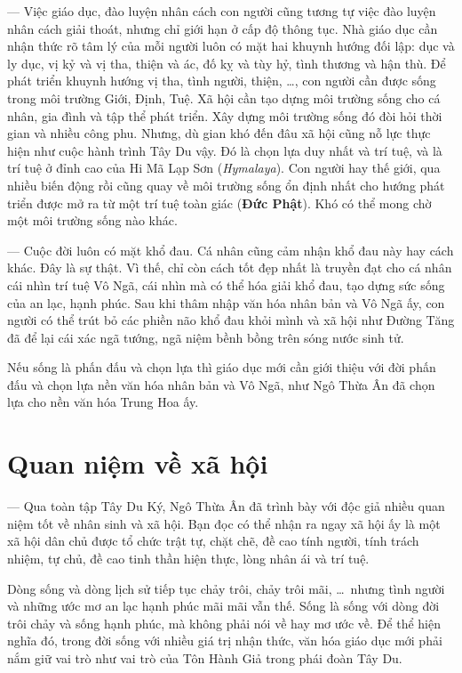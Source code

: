 — Việc giáo dục, đào luyện nhân cách con người cũng tương tự việc đào luyện nhân cách giải thoát, nhưng chỉ giới hạn ở cấp độ thông tục. Nhà giáo dục cần nhận thức rõ tâm lý của mỗi người luôn có mặt hai khuynh hướng đối lập: dục và ly dục, vị kỷ và vị tha, thiện và ác, đố kỵ và tùy hỷ, tình thương và hận thù. Để phát triển khuynh hướng vị tha, tình người, thiện, \ldots, con người cần được sống trong môi trường Giới, Định, Tuệ. Xã hội cần tạo dựng môi trường sống cho cá nhân, gia đình và tập thể phát triển. Xây dựng môi trường sống đó đòi hỏi thời gian và nhiều công phu. Nhưng, dù gian khó đến đâu xã hội cũng nỗ lực thực hiện như cuộc hành trình Tây Du vậy. Đó là chọn lựa duy nhất và trí tuệ, và là trí tuệ ở đỉnh cao của Hi Mã Lạp Sơn (\emph{Hymalaya}). Con người hay thế giới, qua nhiều biến động rồi cũng quay về môi trường sống ổn định nhất cho hướng phát triển được mở ra từ một trí tuệ toàn giác ({\bf Đức Phật}). Khó có thể mong chờ một môi trường sống nào khác.

— Cuộc đời luôn có mặt khổ đau. Cá nhân cũng cảm nhận khổ đau này hay cách khác. Đây là sự thật. Vì thế, chỉ còn cách tốt đẹp nhất là truyền đạt cho cá nhân cái nhìn trí tuệ Vô Ngã, cái nhìn mà có thể hóa giải khổ đau, tạo dựng sức sống của an lạc, hạnh phúc. Sau khi thâm nhập văn hóa nhân bản và Vô Ngã ấy, con người có thể trút bỏ các phiền não khổ đau khỏi mình và xã hội như Đường Tăng đã để lại cái xác ngã tướng, ngã niệm bềnh bồng trên sóng nước sinh tử.

Nếu sống là phấn đấu và chọn lựa thì giáo dục mới cần giới thiệu với đời phấn đấu và chọn lựa nền văn hóa nhân bản và Vô Ngã, như Ngô Thừa Ân đã chọn lựa cho nền văn hóa Trung Hoa ấy.

\section{Quan niệm về xã hội} %
\label{sec:98_99_100_xa_hoi}

— Qua toàn tập Tây Du Ký, Ngô Thừa Ân đã trình bày với độc giả nhiều quan niệm tốt về nhân sinh và xã hội. Bạn đọc có thể nhận ra ngay xã hội ấy là một xã hội dân chủ được tổ chức trật tự, chặt chẽ, đề cao tính người, tính trách nhiệm, tự chủ, đề cao tinh thần hiện thực, lòng nhân ái và trí tuệ.

Dòng sống và dòng lịch sử tiếp tục chảy trôi, chảy trôi mãi, \ldots ~nhưng tình người và những ước mơ an lạc hạnh phúc mãi mãi vẫn thế. Sống là sống với dòng đời trôi chảy và sống hạnh phúc, mà không phải nói về hay mơ ước về. Để thể hiện nghĩa đó, trong đời sống với nhiều giá trị nhận thức, văn hóa giáo dục mới phải nắm giữ vai trò như vai trò của Tôn Hành Giả trong phái đoàn Tây Du.
